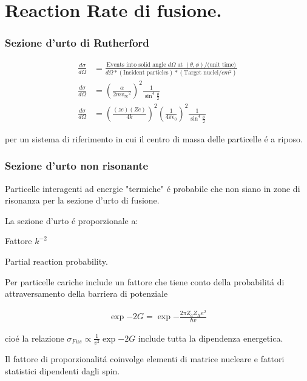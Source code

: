 \chapter{Reaction Rate di fusione.}

\subsection{Sezione d'urto di Rutherford}

\begin{align*}
\frac{d\sigma}{d\Omega} &=\frac{\text{Events into solid angle $d\Omega$ at $(\theta,\phi)$/(unit time)}}{d\Omega*(\text{Incident particles})*(\text{Target nuclei}/cm^2)}\\
\frac{d\sigma}{d\Omega} &=(\frac{\alpha}{2m{v_{\infty}}^2})^2\frac{1}{\sin^4{\frac{\theta}{2}}}\\
\frac{d\sigma}{d\Omega} &=(\frac{(ze)(Ze)}{4k})^2(\frac{1}{4\pi\epsilon_0})^2\frac{1}{\sin^4{\frac{\theta}{2}}}
\end{align*}

per un sistema di riferimento in cui il centro di massa delle particelle \'e a riposo.

\subsection{Sezione d'urto non risonante}
Particelle interagenti ad energie "termiche" \'e probabile che non siano in zone di risonanza per la sezione d'urto di fusione.

La sezione d'urto \'e proporzionale a:
\begin{enumerate*}
\item Fattore $k^{-2}$
\item Partial reaction probability.

Per particelle cariche include un fattore che tiene conto della probabilit\'a di attraversamento della barriera di potenziale 

\begin{align*}
\exp{-2G}=\exp{-\frac{2\pi Z_aZ_Xe^2}{\hbar v}}
\end{align*}

\end{enumerate*}

cio\'e la relazione $\sigma_{Fus}\propto\frac{1}{v^2}\exp{-2G}$ include tutta la dipendenza energetica.

Il fattore di proporzionalit\'a coinvolge elementi di matrice nucleare e fattori statistici dipendenti dagli spin.

